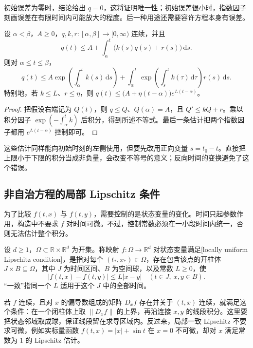 初始误差为零时，结论给出 \(q=0\)，这将证明唯一性；初始误差很小时，指数因子刻画误差在有限时间内可能放大的程度。后一种用途还需要容许方程本身有误差。

\begin{corollary}\label{b2:cor:ode-gronwall-forcing}
设 \(\alpha<\beta\)，\(A\geq0\)，\(q,k,r\colon[\alpha,\beta]\to[0,\infty)\) 连续，并且
\[
 q(t)\leq A+\int_\alpha^t \bigl(k(s)q(s)+r(s)\bigr)\,\mathrm ds.
\]
则对 \(\alpha\leq t\leq\beta\)，
\[
 q(t)\leq A\exp\!\left(\int_\alpha^t k(s)\,\mathrm ds\right)
 +\int_\alpha^t \exp\!\left(\int_s^t k(\tau)\,\mathrm d\tau\right)r(s)\,\mathrm ds.
\]
特别地，若 \(k\leq L\)、\(r\leq\eta\)，则 \(q(t)\leq\bigl(A+\eta(t-\alpha)\bigr)e^{L(t-\alpha)}\)。
\end{corollary}
\begin{proof}
把假设右端记为 \(Q(t)\)，则 \(q\leq Q\)、\(Q(\alpha)=A\)，且 \(Q'\leq kQ+r\)。乘以积分因子 \(\exp(-\int_\alpha^t k)\) 后积分，得到所述不等式。最后一条估计把两个指数因子都用 \(e^{L(t-\alpha)}\) 控制即可。
\end{proof}

这些估计同样能向初始时刻的左侧使用，但要先改用正向变量 \(s=t_0-t\)。直接把上限小于下限的积分当成非负量，会改变不等号的意义；反向时间的变换避免了这个错误。

\subsection{非自治方程的局部 Lipschitz 条件}
\label{b2:subsec:ode-nonautonomous-lipschitz}

为了比较 \(f(t,x)\) 与 \(f(t,y)\)，需要控制的是状态变量的变化。时间只起参数作用，构造中不要求 \(f\) 对时间可微。不过，控制常数必须在一小段时间内统一，否则无法估计整个积分。

\begin{definition}\label{b2:def:ode-local-lipschitz}
设 \(d\geq1\)，\(\Omega\subset\mathbb R\times\mathbb R^d\) 为开集。称映射 \(f\colon\Omega\to\mathbb R^d\) 对状态变量满足[locally uniform Lipschitz condition]，是指对每个 \((t_*,x_*)\in\Omega\)，存在包含该点的开柱体 \(J\times B\subseteq\Omega\)，其中 \(J\) 为时间区间、\(B\) 为空间球，以及常数 \(L\geq0\)，使
\[
 |f(t,x)-f(t,y)|\leq L|x-y|
 \quad(t\in J,\ x,y\in B).
\]
“一致”指同一个 \(L\) 适用于这个 \(J\) 中的全部时间。
\end{definition}

若 \(f\) 连续，且对 \(x\) 的偏导数组成的矩阵 \(D_xf\) 存在并关于 \((t,x)\) 连续，就满足这个条件：在一个闭柱体上取 \(\|D_xf\|\) 的上界，再沿连接 \(x,y\) 的线段积分。这里要把状态邻域取成球，保证线段留在求导区域内。反过来，局部一致 Lipschitz 不要求可微，例如实标量函数 \(f(t,x)=|x|+\sin t\) 在 \(x=0\) 不可微，却对 \(x\) 满足常数为 \(1\) 的 Lipschitz 估计。

